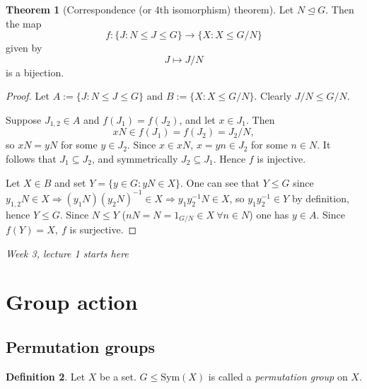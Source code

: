 \documentclass[a4paper]{article}
\newcommand{\Sym}{\text{Sym}}
\theoremstyle{definition}
\newtheorem{defn}{Definition}[subsection]
\newtheorem{thm}[defn]{Theorem}
\begin{document}
\begin{thm}[Correspondence (or 4th isomorphism) theorem]
Let $N\unlhd G$. Then the map
\[
f:\{J:N\leq J\leq G\} \rightarrow \{X:X\leq G/N\}
\]
given by
\[
J\mapsto J/N
\]
is a bijection.
\end{thm}
\begin{proof}
Let $A:=\{J:N\leq J\leq G\}$ and $B:=\{X:X\leq G/N\}$. Clearly $J/N\leq G/N$.

Suppose $J_{1,2}\in A$ and $f(J_1)=f(J_2)$, and let $x\in J_1$. Then
\[
xN\in f(J_1)=f(J_2)=J_2/N,
\]
so $xN=yN$ for some $y\in J_2$. Since $x\in xN$, $x=yn\in J_2$ for some $n\in N$. It follows that $J_1\subseteq J_2$, and symmetrically $J_2\subseteq J_1$. Hence $f$ is injective.

Let $X\in B$ and set $Y=\{y\in G:yN\in X\}$. One can see that $Y\leq G$ since $y_{1,2}N\in X\Rightarrow (y_1N)(y_2N)^{-1}\in X\Rightarrow y_1y_2^{-1}N \in X$, so $y_1y_2^{-1}\in Y$ by definition, hence $Y\leq G$. Since $N\leq Y$ ($nN=N=1_{G/N}\in X \ \forall n\in N$) one has $y\in A$. Since $f(Y)=X,\ f$ is surjective.
\end{proof}

\begin{flushright}
\textit{Week 3, lecture 1 starts here}
\end{flushright}

\section{Group action}
\subsection{Permutation groups}
\begin{defn}
Let $X$ be a set. $G\leq\Sym(X)$ is called a \textit{permutation group} on $X$.
\end{defn}
\end{document}
